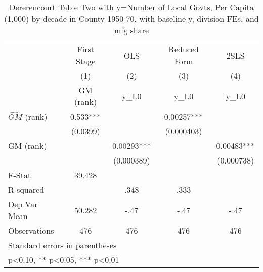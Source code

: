 \begin{table}[htbp]\centering
\def\sym#1{\ifmmode^{#1}\else\(^{#1}\)\fi}
\caption{Dererencourt Table Two with y=Number of Local Govts, Per Capita (1,000) by decade in County 1950-70, with baseline y, division FEs, and mfg share}
\begin{tabular}{l*{4}{c}}
\toprule
                    & First Stage   &         OLS   &Reduced Form   &        2SLS   \\
                    &\multicolumn{1}{c}{(1)}&\multicolumn{1}{c}{(2)}&\multicolumn{1}{c}{(3)}&\multicolumn{1}{c}{(4)}\\
                    &\multicolumn{1}{c}{GM  (rank)}&\multicolumn{1}{c}{y\_L0}&\multicolumn{1}{c}{y\_L0}&\multicolumn{1}{c}{y\_L0}\\
\midrule
$\hat{GM}$ (rank)   &       0.533***&               &     0.00257***&               \\
                    &    (0.0399)   &               &  (0.000403)   &               \\
\addlinespace
GM  (rank)          &               &     0.00293***&               &     0.00483***\\
                    &               &  (0.000389)   &               &  (0.000738)   \\
\midrule
F-Stat              &      39.428   &               &               &               \\
R-squared           &               &        .348   &        .333   &               \\
Dep Var Mean        &      50.282   &        -.47   &        -.47   &        -.47   \\
Observations        &         476   &         476   &         476   &         476   \\
\bottomrule
\multicolumn{5}{l}{\footnotesize Standard errors in parentheses}\\
\multicolumn{5}{l}{\footnotesize * p<0.10, ** p<0.05, *** p<0.01}\\
\end{tabular}
\end{table}
